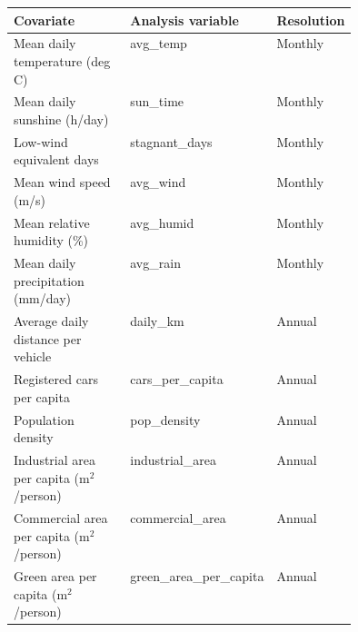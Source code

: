 \begin{tabular}{p{0.44\linewidth}ll}
\toprule
Covariate & Analysis variable & Resolution \\
\midrule
Mean daily temperature (deg C) & avg\_temp & Monthly \\
Mean daily sunshine (h/day) & sun\_time & Monthly \\
Low-wind equivalent days & stagnant\_days & Monthly \\
Mean wind speed (m/s) & avg\_wind & Monthly \\
Mean relative humidity (\%) & avg\_humid & Monthly \\
Mean daily precipitation (mm/day) & avg\_rain & Monthly \\
Average daily distance per vehicle & daily\_km & Annual \\
Registered cars per capita & cars\_per\_capita & Annual \\
Population density & pop\_density & Annual \\
Industrial area per capita (m$^2$/person) & industrial\_area & Annual \\
Commercial area per capita (m$^2$/person) & commercial\_area & Annual \\
Green area per capita (m$^2$/person) & green\_area\_per\_capita & Annual \\
\bottomrule
\end{tabular}
